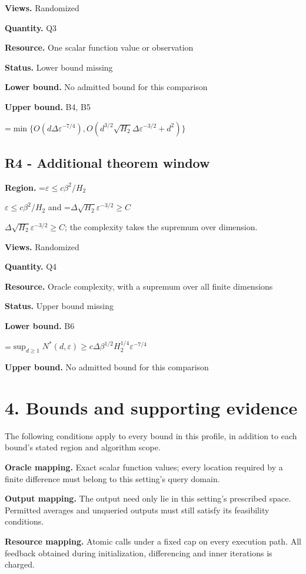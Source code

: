 \documentclass[10pt,a4paper]{article}
\newcommand{\AtlasMath}[1]{\par\begingroup\centering\setbox0=\hbox{$\displaystyle #1$}\ifdim\wd0>1.4\linewidth\typeout{ATLAS WIDE FORMULA: \the\wd0}\fi\ifdim\wd0>\linewidth\resizebox{\linewidth}{!}{\box0}\else\box0\fi\par\endgroup}
\newcommand{\AtlasInlineMath}[1]{\begingroup\setbox0=\hbox{$#1$}\ifdim\wd0>.4\linewidth\endgroup\AtlasMath{#1}\else\endgroup$#1$\fi}
\begin{document}
\textbf{Views.} Randomized

\textbf{Quantity.} Q3

\textbf{Resource.} One scalar function value or observation

\textbf{Status.} Lower bound missing

\textbf{Lower bound.} No admitted bound for this comparison

\textbf{Upper bound.} B4, B5

\AtlasMath{\min\{O(d\Delta\varepsilon^{-7/4}),O(d^{3/2}\sqrt{H_2}\Delta\varepsilon^{-3/2}+d^2)\}}
\subsection{R4 - Additional theorem window}
\textbf{Region.} \AtlasInlineMath{\varepsilon\le c\beta^2/H_2} and \AtlasInlineMath{\Delta\sqrt{H_2}\varepsilon^{-3/2}\ge C}; the complexity takes the supremum over dimension.

\textbf{Views.} Randomized

\textbf{Quantity.} Q4

\textbf{Resource.} Oracle complexity, with a supremum over all finite dimensions

\textbf{Status.} Upper bound missing

\textbf{Lower bound.} B6

\AtlasMath{\sup_{d\ge1}N^*(d,\varepsilon)\ge c\Delta\beta^{1/2}H_2^{1/4}\varepsilon^{-7/4}}
\textbf{Upper bound.} No admitted bound for this comparison

\section{4. Bounds and supporting evidence}
The following conditions apply to every bound in this profile, in addition to each bound's stated region and algorithm scope.

\textbf{Oracle mapping.} Exact scalar function values; every location required by a finite difference must belong to this setting's query domain.

\textbf{Output mapping.} The output need only lie in this setting's prescribed space. Permitted averages and unqueried outputs must still satisfy its feasibility conditions.

\textbf{Resource mapping.} Atomic calls under a fixed cap on every execution path. All feedback obtained during initialization, differencing and inner iterations is charged.
\end{document}
